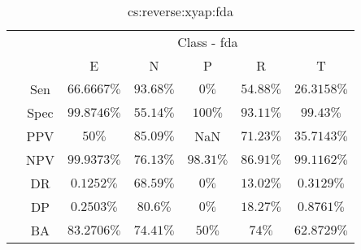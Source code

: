 \begin{table}[!ht]
	\centering
	\begin{tabular}{|c|c|c|c|c|c|c|}
		\cline{3-7}
		\multicolumn{2}{c|}{} & \multicolumn{5}{c|}{Class - fda} \\ \cline{3-7}
		\multicolumn{2}{c|}{} & E & N & P & R & T \\ \hline
		\multirow{7}{*}{\rotatebox{90}{Statistics}} & Sen & $66.6667\%$ & $93.68\%$ & $0\%$ & $54.88\%$ & $26.3158\%$ \\ \cline{2-7}
		 & Spec & $99.8746\%$ & $55.14\%$ & $100\%$ & $93.11\%$ & $99.43\%$ \\ \cline{2-7}
		 & PPV & $50\%$ & $85.09\%$ & NaN & $71.23\%$ & $35.7143\%$ \\ \cline{2-7}
		 & NPV & $99.9373\%$ & $76.13\%$ & $98.31\%$ & $86.91\%$ & $99.1162\%$ \\ \cline{2-7}
		 & DR & $0.1252\%$ & $68.59\%$ & $0\%$ & $13.02\%$ & $0.3129\%$ \\ \cline{2-7}
		 & DP & $0.2503\%$ & $80.6\%$ & $0\%$ & $18.27\%$ & $0.8761\%$ \\ \cline{2-7}
		 & BA & $83.2706\%$ & $74.41\%$ & $50\%$ & $74\%$ & $62.8729\%$ \\ \hline
	\end{tabular}
	\caption{cs:reverse:xyap:fda}
	\label{tab:cs:reverse:xyap:fda}
\end{table}
